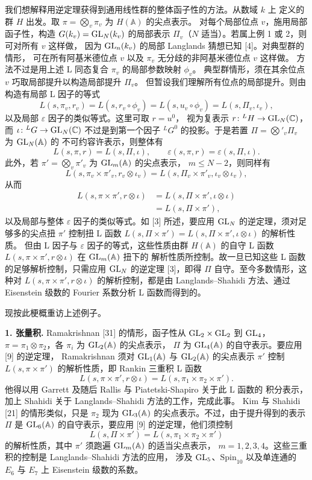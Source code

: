 我们想解释用逆定理获得到通用线性群的整体函子性的方法。从数域 $k$ 上
定义的群 $H$ 出发。取 $\pi=\bigotimes_v\pi_v$ 为 $H(\mathbb{A})$ 的尖点表示。
对每个局部位点 $v$，施用局部函子性，构造 $G(k_v)=\mathrm{GL}_N(k_v)$ 的局部表示
$\Pi_v$（$N$ 适当）。若属上例 1 或 2，则可对所有 $v$ 这样做，
因为 $\mathrm{GL}_n(k_v)$ 的局部 Langlands 猜想已知 [4]。对典型群的情形，
可在所有阿基米德位点 $v$ 以及 $\pi_v$ 无分歧的非阿基米德位点 $v$ 这样做。
方法不过是用上述 L 同态复合 $\pi_v$ 的局部参数映射 $\phi_v$。
典型群情形，须在其余位点 $v$ 巧取局部提升以构造局部提升 $\Pi_v$。
但暂设我们理解所有位点的局部提升。则由构造有局部 L 因子的等式
\[
  L(s,\pi_v,r_v)=L(s,r_v\circ\phi_v)=L(s,u_v\circ\phi_v)
  =L(s,\Pi_v,\iota_v),
\]
以及局部 $\varepsilon$ 因子的类似等式。这里可取 $r=u^{0}$，
视为复表示 $r\colon{}^{L}H\to\mathrm{GL}_N(\mathbb{C})$，而
$\iota\colon{}^{L}G\to\mathrm{GL}_N(\mathbb{C})$ 不过是到第一个因子 ${}^{L}G^{0}$
的投影。于是若置 $\Pi=\bigotimes'_v\Pi_v$ 为 $\mathrm{GL}_N(\mathbb{A})$ 的
不可约容许表示，则整体有
\[
  L(s,\pi,r)=L(s,\Pi,\iota),\qquad
  \varepsilon(s,\pi,r)=\varepsilon(s,\Pi,\iota).
\]
此外，若 $\pi'=\bigotimes_v\pi'_v$ 为 $\mathrm{GL}_m(\mathbb{A})$ 的尖点表示，
$m\le N-2$，则同样有
\[
  L(s,\pi_v\times\pi'_v,r_v\otimes\iota_v)
  =L(s,\Pi_v\times\pi'_v,\iota_v\otimes\iota_v),
\]
从而
\[
\begin{aligned}
  L(s,\pi\times\pi',r\otimes\iota)
  &=L(s,\Pi\times\pi',\iota\otimes\iota)\\
  &=L(s,\Pi\times\pi'),
\end{aligned}
\]
以及局部与整体 $\varepsilon$ 因子的类似等式。如 [3] 所述，要应用 $\mathrm{GL}_N$
的逆定理，须对足够多的尖点扭 $\pi'$ 控制扭 L 函数
$L(s,\Pi\times\pi')=L(s,\Pi\times\pi',\iota\otimes\iota)$ 的解析性质。
但由 L 因子与 $\varepsilon$ 因子的等式，这些性质由群 $H(\mathbb{A})$ 的自守
L 函数 $L(s,\pi\times\pi',r\otimes\iota)$ 在 $\mathrm{GL}_m(\mathbb{A})$ 扭下的
解析性质所控制。故一旦已知这些 L 函数的足够解析控制，只需应用 $\mathrm{GL}_N$
的逆定理 [3]，即得 $\Pi$ 自守。至今多数情形，这种对
$L(s,\pi\times\pi',r\otimes\iota)$ 的解析控制，都是由 Langlands--Shahidi
方法、通过 Eisenstein 级数的 Fourier 系数分析 L 函数而得到的。

现按此梗概重访上述例子。

\par\medskip\noindent\textbf{1. 张量积.}\quad
Ramakrishnan [31] 的情形，函子性从 $\mathrm{GL}_2\times\mathrm{GL}_2$ 到 $\mathrm{GL}_4$，
$\pi=\pi_1\otimes\pi_2$，各 $\pi_i$ 为 $\mathrm{GL}_2(\mathbb{A})$ 的尖点表示，
$\Pi$ 为 $\mathrm{GL}_4(\mathbb{A})$ 的自守表示。要应用 [9] 的逆定理，
Ramakrishnan 须对 $\mathrm{GL}_1(\mathbb{A})$ 与 $\mathrm{GL}_2(\mathbb{A})$ 的尖点表示
$\pi'$ 控制 $L(s,\pi\times\pi')$ 的解析性质，即 Rankin 三重积 L 函数
\[
  L(s,\pi\times\pi',r\otimes\iota)=L(s,\pi_1\times\pi_2\times\pi').
\]
他得以用 Garrett 及随后 Rallis 与 Piatetski-Shapiro 关于此 L 函数的
积分表示，加上 Shahidi 关于 Langlands--Shahidi 方法的工作，完成此事。
Kim 与 Shahidi [21] 的情形类似，只是 $\pi_2$ 现为 $\mathrm{GL}_3(\mathbb{A})$
的尖点表示。不过，由于提升得到的表示 $\Pi$ 是 $\mathrm{GL}_6(\mathbb{A})$
的自守表示，要应用 [9] 的逆定理，他们须控制
\[
  L(s,\Pi\times\pi')=L(s,\pi_1\times\pi_2\times\pi')
\]
的解析性质，其中 $\pi'$ 须跑遍 $\mathrm{GL}_m(\mathbb{A})$ 的适当尖点表示，
$m=1,2,3,4$。这些三重积的控制是 Langlands--Shahidi 方法的应用，
涉及 $\mathrm{GL}_5$、$\mathrm{Spin}_{10}$ 以及单连通的 $E_6$ 与 $E_7$ 上
Eisenstein 级数的系数。

